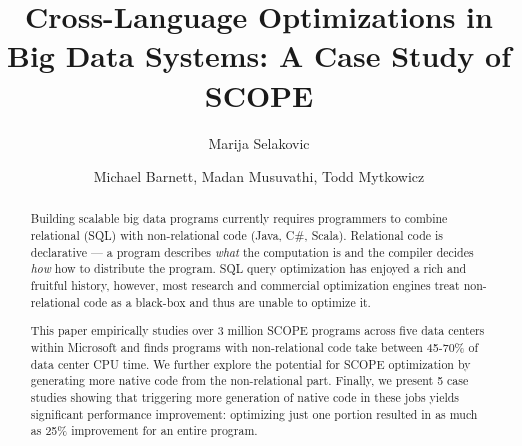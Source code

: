 \documentclass[sigconf]{acmart}
\begin{document}
\title{Cross-Language Optimizations in Big Data Systems: A Case Study of SCOPE}


\author{Marija Selakovic}


\author{Michael Barnett, Madan Musuvathi, Todd Mytkowicz}




  





  


\renewcommand{\shortauthors}{M. Selakovic et al.}


\begin{abstract}

  Building scalable big data programs currently requires programmers to combine relational (SQL) with non-relational code (Java, C\#, Scala).
  Relational code is declarative --- a program describes \emph{what} the computation is and the compiler decides \emph{how} how to distribute the program.  SQL query optimization has enjoyed a rich and fruitful history, however, most research and commercial optimization engines treat non-relational code as a black-box and thus are unable to optimize it.

  This paper empirically studies over 3 million SCOPE programs across five data centers within Microsoft and finds programs with non-relational code take between 45-70\% of data center CPU time.
  We further explore the potential for SCOPE optimization by generating more native code from the non-relational part. Finally, we present 5 case studies showing that triggering more generation of native code in these jobs yields significant performance improvement: optimizing just one portion resulted in as much as 25\% improvement for an entire program.

\end{abstract}
\end{document}
